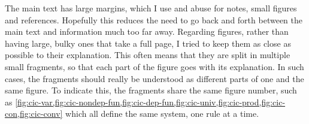 The main text has large margins, which I use and abuse 
for notes, small figures and references. Hopefully this reduces the need to go
back and forth between the main text and information much too far away.
Regarding figures, rather than having large, bulky ones that take a full page,
I tried to keep them as close as possible to their explanation. This often means that
they are split in multiple small fragments, so that each part of the figure goes with its
explanation. In such cases, the fragments should really be understood
as different parts of one and the same figure. To indicate this, the fragments share the same
figure number, such as
\cref{fig:cic-var,fig:cic-nondep-fun,fig:cic-dep-fun,fig:cic-univ,fig:cic-prod,fig:cic-con,fig:cic-conv} which all define the same system, one rule at a time.




\begingroup %

\hypersetup{allcolors=.}

\setlength{\textheight}{230\vscale} %

\etocstandarddisplaystyle %
\etocstandardlines %
\setcounter{tocdepth}{\sectiontocdepth} %

\tableofcontents %

\setcounter{tocdepth}{\subsectiontocdepth} %




\endgroup
{}
